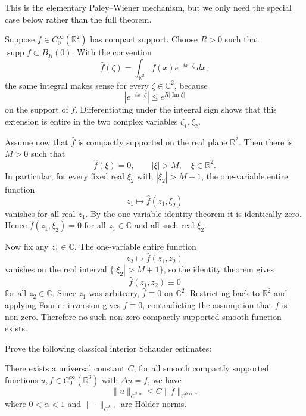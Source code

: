 \begin{solution}
This is the elementary Paley--Wiener mechanism, but we only need the special case below rather than the full theorem.

Suppose $f \in C_0^\infty(\mathbb{R}^2)$ has compact support.  Choose $R>0$ such that $\operatorname{supp} f\subset B_R(0)$.  With the convention
\[
\widehat f(\zeta)=\int_{\mathbb{R}^2}f(x)e^{-ix\cdot \zeta}\,dx,
\]
the same integral makes sense for every $\zeta\in\mathbb{C}^2$, because
\[
|e^{-ix\cdot \zeta}|
\leq e^{R|\operatorname{Im}\zeta|}
\]
on the support of $f$.  Differentiating under the integral sign shows that this extension is entire in the two complex variables $\zeta_1,\zeta_2$.

Assume now that $\widehat f$ is compactly supported on the real plane $\mathbb{R}^2$.  Then there is $M>0$ such that
\[
\widehat f(\xi)=0,\qquad |\xi|>M,\quad \xi\in\mathbb{R}^2.
\]
In particular, for every fixed real $\xi_2$ with $|\xi_2|>M+1$, the one-variable entire function
\[
z_1\mapsto \widehat f(z_1,\xi_2)
\]
vanishes for all real $z_1$.  By the one-variable identity theorem it is identically zero.  Hence $\widehat f(z_1,\xi_2)=0$ for all $z_1\in\mathbb{C}$ and all such real $\xi_2$.

Now fix any $z_1\in\mathbb{C}$.  The one-variable entire function
\[
z_2\mapsto \widehat f(z_1,z_2)
\]
vanishes on the real interval $\{|\xi_2|>M+1\}$, so the identity theorem gives
\[
\widehat f(z_1,z_2)\equiv 0
\]
for all $z_2\in\mathbb{C}$.  Since $z_1$ was arbitrary, $\widehat f\equiv 0$ on $\mathbb{C}^2$.  Restricting back to $\mathbb{R}^2$ and applying Fourier inversion gives $f\equiv0$, contradicting the assumption that $f$ is non-zero.  Therefore no such non-zero compactly supported smooth function exists.
\end{solution}

\begin{exercise}
\label{analysis:2019:7}
Prove the following classical interior Schauder estimates:

There exists a universal constant $C$, for all smooth compactly supported functions $u,f\in C_0^{\infty}(\mathbb{R}^3)$ with $\Delta u = f$, we have
\[
\|u\|_{C^{2,\alpha}} \leq C\|f\|_{C^{0,\alpha}},
\]
where $0<\alpha<1$ and $\|\cdot\|_{C^{k,\alpha}}$ are H\"older norms.
\end{exercise}

